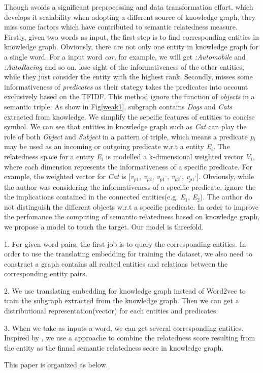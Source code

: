 Though \cite{aaai/Pirro12} avoids a significant preprocessing and data
transformation effort, which develops it scalability when adopting a
different source of knowledge graph, they miss some factors which
have contributed to semantic relatedness measure. Firstly, given two words
as input, the first step is to find corresponding entities in knowledge
graph. Obviously, there are not only one entity in knowledge graph for a single
word. For a input word \emph{car}, for example, we will get \emph{:Automobile} and
\emph{:Auto\underline{\hspace{0.5em}}Racing} and so on. \cite{aaai/Pirro12} lose
sight of the informativeness of the other entities, while they just
consider the entity with the highest rank. Secondly, \cite{aaai/Pirro12} misses
some informativeness of \emph{predicates} as their stategy takes
the predicates into account exclusively based on the TFIDF. This
method ignore the function of \emph{objects} in a semantic triple.
As show in Fig\ref{weak1}, subgraph contains \emph{Dogs} and \emph{Cats} extracted from
knowledge. We simplify the sepcific features of entities to concise symbol. 
We can see that entities in knowledge graph such as \emph{Cat} can play the role 
of both \emph{Object} and \emph{Subject} in a pattern of triple, which means a predicate 
\emph{p$_i$} may be used as an incoming or outgoing predicate w.r.t a entity
\emph{E$_i$}. The relatedness space for a entity \emph{E$_i$} is modelled a 
k-dimensional weighted vector \emph{V$_i$}, where each dimension represents
the informativeness of a specific predicate\cite{BudanitskyH06}. For example, the weighted
vector for \emph{Cat} is 
[\emph{v$_{p1}$}, \emph{v$_{p2}$}, \emph{v$_{p1}$$^,$}, \emph{v$_{p2}$$^,$}, \emph{v$_{p1}$$^,$}]. 
Obviously, while the author was considering the informativeness of a specific 
predicate, ignore the the implications contained in the connected entities(e.g.
\emph{E$_1$}, \emph{E$_2$}). The author do not distinguish the different 
objects w.r.t a specific predicate. In order to improve the perfomance the computing
of semantic relatedness based on knowledge graph, we propose a model to touch 
the target. Our model is threefold.

1. For given word pairs, the first job is to query
the corresponding entities. In order to use the
translating embedding for training the dataset, we
also need to construct a graph contains all realted
entities and relations between the corresponding
entity pairs.

2. We use translating embedding for knowledge
graph instead of Word2vec to train the subgraph
extracted from the knowledge graph. Then we can
get a distributional representation(vector) for each
entities and predicates. 

3. When we take as inputs a word, we can get several 
corresponding entities. Inspired by \cite{acl/IacobacciPN15}, we use 
a approache to combine the relatedness score resulting from the
entity as the finnal semantic relatedness score in knowledge graph.

This paper is organized as below. 